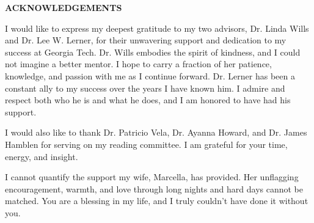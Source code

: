 \clearpage
\begin{centering}
\textbf{ACKNOWLEDGEMENTS}\\
\vspace{\baselineskip}
\end{centering}


I would like to express my deepest gratitude to my two advisors, Dr. Linda Wills and Dr. Lee W. Lerner, for their unwavering support and dedication to my success at Georgia Tech. Dr. Wills embodies the spirit of kindness, and I could not imagine a better mentor. I hope to carry a fraction of her patience, knowledge, and passion with me as I continue forward. Dr. Lerner has been a constant ally to my success over the years I have known him. I admire and respect both who he is and what he does, and I am honored to have had his support.

I would also like to thank Dr. Patricio Vela, Dr. Ayanna Howard, and Dr. James Hamblen for serving on my reading committee. I am grateful for your time, energy, and insight.

I cannot quantify the support my wife, Marcella, has provided. Her unflagging encouragement, warmth, and love through long nights and hard days cannot be matched. You are a blessing in my life, and I truly couldn't have done it without you.

\clearpage
